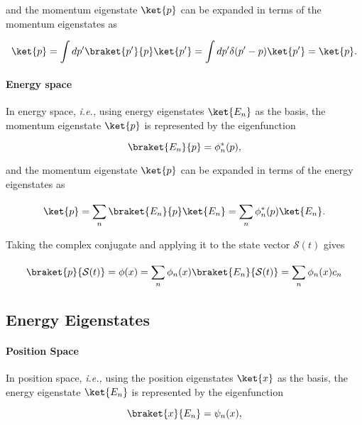 \documentclass[a4paper,12pt]{report}
\begin{document}
and the momentum eigenstate \(\ket{p} \) can be expanded in terms of the momentum eigenstates as

\begin{equation}
  \ket{p} = \int dp' \braket{p'}{p} \ket{p'} = \int dp' \delta (p'-p) \ket{p'} = \ket{p}.  
\end{equation}

\paragraph{Energy space}

In energy space, \textit{i.e.,} using energy eigenstates \(\ket{E_{n} } \) as the basis, the momentum eigenstate \(\ket{p} \) is represented by the eigenfunction 

\begin{equation}
  \braket{E_{n} }{p} = \phi _{n}^*(p) ,
\end{equation}

and the momentum eigenstate \(\ket{p} \) can be expanded in terms of the energy eigenstates as 

\begin{equation}
  \ket{p} = \sum_{n}^{} \braket{E_{n} }{p} \ket{E_{n} } = \sum_{n}^{} \phi _{n}^*(p) \ket{E_{n} }.       
\end{equation}

Taking the complex conjugate and applying it to the state vector \(\mathcal{S}(t)\) gives 

\begin{equation}
  \braket{p}{\mathcal{S}(t)} = \phi (x) = \sum_{n}^{} \phi _{n}(x) \braket{E_{n} }{\mathcal{S}(t)} = \sum_{n}^{} \phi _{n}(x) c_{n}       
\end{equation}

\subsection{Energy Eigenstates}

\paragraph{Position Space}

In position space, \textit{i.e.,} using the position eigenstates \(\ket{x} \) as the basis, the energy eigenstate \(\ket{E_{n} } \) is represented by the eigenfunction

\begin{equation}
  \braket{x}{E_{n} } = \psi _{n}(x) ,
\end{equation}
\end{document}
